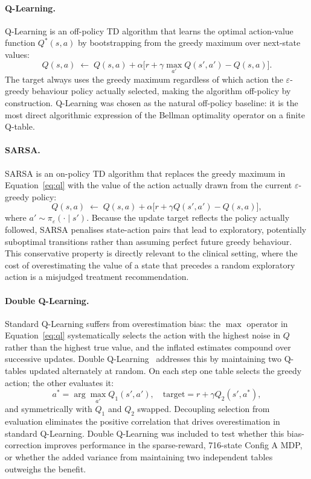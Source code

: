 \documentclass[11pt,a4paper]{article}
\begin{document}
\paragraph{Q-Learning.}
Q-Learning is an off-policy TD algorithm that learns the optimal action-value
function $Q^*(s, a)$ by bootstrapping from the greedy maximum over next-state
values:
\begin{equation}
  Q(s, a) \;\leftarrow\; Q(s, a)
    + \alpha\bigl[r + \gamma \max_{a'} Q(s', a') - Q(s, a)\bigr].
  \label{eq:ql}
\end{equation}
The target always uses the greedy maximum regardless of which action the
$\varepsilon$-greedy behaviour policy actually selected, making the algorithm
off-policy by construction. Q-Learning was chosen as the natural off-policy
baseline: it is the most direct algorithmic expression of the Bellman optimality
operator on a finite Q-table.

\paragraph{SARSA.}
SARSA is an on-policy TD algorithm that replaces the greedy maximum in
Equation~\ref{eq:ql} with the value of the action actually drawn from the
current $\varepsilon$-greedy policy:
\begin{equation}
  Q(s, a) \;\leftarrow\; Q(s, a)
    + \alpha\bigl[r + \gamma Q(s', a') - Q(s, a)\bigr],
  \label{eq:sarsa}
\end{equation}
where $a' \sim \pi_\varepsilon(\cdot \mid s')$. Because the update target
reflects the policy actually followed, SARSA penalises state-action pairs
that lead to exploratory, potentially suboptimal transitions rather than
assuming perfect future greedy behaviour. This conservative property is
directly relevant to the clinical setting, where the cost of overestimating
the value of a state that precedes a random exploratory action is a
misjudged treatment recommendation.

\paragraph{Double Q-Learning.}
Standard Q-Learning suffers from overestimation bias: the $\max$ operator in
Equation~\ref{eq:ql} systematically selects the action with the highest noise
in $Q$ rather than the highest true value, and the inflated estimates compound
over successive updates. Double Q-Learning~\cite{hasselt2010} addresses this by
maintaining two Q-tables updated alternately at random. On each step one table
selects the greedy action; the other evaluates it:
\begin{equation}
  a^* = \arg\max_{a'} Q_1(s', a'), \quad
  \text{target} = r + \gamma Q_2(s', a^*),
  \label{eq:dql}
\end{equation}
and symmetrically with $Q_1$ and $Q_2$ swapped. Decoupling selection from
evaluation eliminates the positive correlation that drives overestimation in
standard Q-Learning. Double Q-Learning was included to test whether this
bias-correction improves performance in the sparse-reward, 716-state Config A
MDP, or whether the added variance from maintaining two independent tables
outweighs the benefit.
\end{document}
